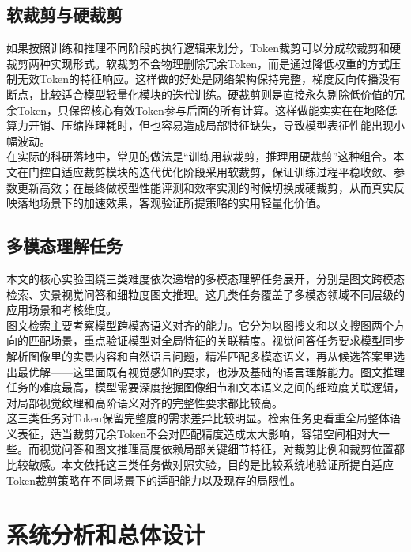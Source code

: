 \documentclass{article}
\begin{document}
{{{{{{{{{{		\subsection{软裁剪与硬裁剪}
		{\setlength{\parindent}{2em}\setlength{\baselineskip}{20pt}\selectfont
			如果按照训练和推理不同阶段的执行逻辑来划分，Token裁剪可以分成软裁剪和硬裁剪两种实现形式。软裁剪不会物理删除冗余Token，而是通过降低权重的方式压制无效Token的特征响应。这样做的好处是网络架构保持完整，梯度反向传播没有断点，比较适合模型轻量化模块的迭代训练。硬裁剪则是直接永久剔除低价值的冗余Token，只保留核心有效Token参与后面的所有计算。这样做能实实在在地降低算力开销、压缩推理耗时，但也容易造成局部特征缺失，导致模型表征性能出现小幅波动。\\
			在实际的科研落地中，常见的做法是“训练用软裁剪，推理用硬裁剪”这种组合。本文在门控自适应裁剪模块的迭代优化阶段采用软裁剪，保证训练过程平稳收敛、参数更新高效；在最终做模型性能评测和效率实测的时候切换成硬裁剪，从而真实反映落地场景下的加速效果，客观验证所提策略的实用轻量化价值。
		\subsection{多模态理解任务}
		{\setlength{\parindent}{2em}\setlength{\baselineskip}{20pt}\selectfont
			本文的核心实验围绕三类难度依次递增的多模态理解任务展开，分别是图文跨模态检索、实景视觉问答和细粒度图文推理。这几类任务覆盖了多模态领域不同层级的应用场景和考核维度。\\
			图文检索主要考察模型跨模态语义对齐的能力。它分为以图搜文和以文搜图两个方向的匹配场景，重点验证模型对全局特征的关联精度。视觉问答任务要求模型同步解析图像里的实景内容和自然语言问题，精准匹配多模态语义，再从候选答案里选出最优解——这里面既有视觉感知的要求，也涉及基础的语言理解能力。图文推理任务的难度最高，模型需要深度挖掘图像细节和文本语义之间的细粒度关联逻辑，对局部视觉纹理和高阶语义对齐的完整性要求都比较高。\\
			这三类任务对Token保留完整度的需求差异比较明显。检索任务更看重全局整体语义表征，适当裁剪冗余Token不会对匹配精度造成太大影响，容错空间相对大一些。而视觉问答和图文推理高度依赖局部关键细节特征，对裁剪比例和裁剪位置都比较敏感。本文依托这三类任务做对照实验，目的是比较系统地验证所提自适应Token裁剪策略在不同场景下的适配能力以及现存的局限性。
	\section{系统分析和总体设计}
}}}}}}}}}}}}
\end{document}
